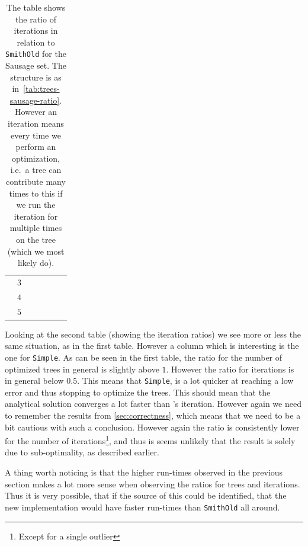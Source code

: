 \begin{table}[htbp]
{\begin{tabular}{ccccccc}
     & $3$ &        &        &        &        &        \\
     & $4$ &        &        &        &        &        \\
     & $5$ &        &        &        &        &        \\
\bottomrule
\end{tabular}
}
  \caption[Iteration ratio for Sausage]{The table shows the ratio of iterations
     in relation to \texttt{SmithOld} for the Sausage set. The structure is as
     in~\cref{tab:trees-sausage-ratio}. However an iteration means every time we
     perform an optimization, i.e.\ a tree can contribute many times to this if
     we run the iteration for multiple times on the tree (which we most likely
     do).\label{tab:iterations-sausage-ratio}}
\end{table}

Looking at the second table (showing the iteration ratios) we see more or less
the same situation, as in the first table. However a column which is interesting
is the one for \texttt{Simple}. As can be seen in the first table, the ratio for
the number of optimized trees in general is slightly above $1$. However the
ratio for iterations is in general below $0.5$. This means that \texttt{Simple},
is a lot quicker at reaching a low error and thus stopping to optimize the
trees. This should mean that the analytical solution converges a lot faster than
\autocite{smith1992}'s iteration. However again we need to remember the results
from \cref{sec:correctness}, which means that we need to be a bit cautious with
such a conclusion. However again the ratio is consistently lower for the number
of iterations\footnote{Except for a single outlier}, and thus is seems unlikely
that the result is solely due to sub-optimality, as described earlier.

A thing worth noticing is that the higher run-times observed in the previous
section makes a lot more sense when observing the ratios for trees and iterations.
Thus it is very possible, that if the source of this could be identified, that
the new implementation would have faster run-times than \texttt{SmithOld} all around.

